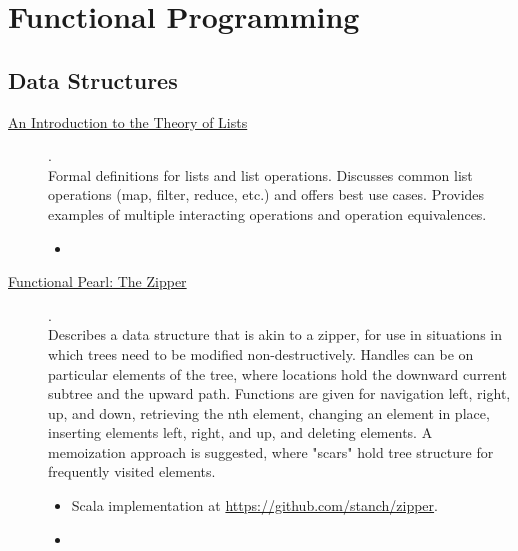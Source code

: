 \chapter {Functional Programming}

\section{Data Structures}

\begin{description}
  \item[\href{https://www.cs.ox.ac.uk/files/3378/PRG56.pdf}{An Introduction to the Theory of Lists}] {\cite{bird1987introduction}.
    \\ Formal definitions for lists and list operations. Discusses common list operations (map, filter, reduce, etc.) and offers best use cases. Provides examples of multiple interacting operations and operation equivalences.
    \begin{itemize}
      \item {}
    \end{itemize}}
  \item[\href{https://www.st.cs.uni-saarland.de/edu/seminare/2005/advanced-fp/docs/huet-zipper.pdf}{Functional Pearl: The Zipper}] {\cite{huet1997zipper}.
    \\ Describes a data structure that is akin to a zipper, for use in situations in which trees need to be modified non-destructively. Handles can be on particular elements of the tree, where locations hold the downward current subtree and the upward path. Functions are given for navigation left, right, up, and down, retrieving the nth element, changing an element in place, inserting elements left, right, and up, and deleting elements. A memoization approach is suggested, where "scars" hold tree structure for frequently visited elements.
    \begin{itemize}
      \item Scala implementation at \href{https://github.com/stanch/zipper}{https://github.com/stanch/zipper}.
      \item {}
    \end{itemize}}
\end{description}
